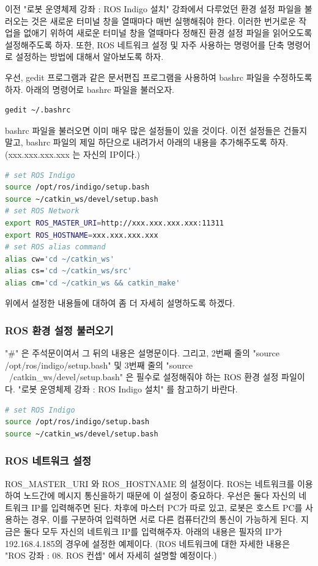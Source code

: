 이전 "로봇 운영체제 강좌 : ROS Indigo 설치" 강좌에서 다루었던 환경 설정 파일을 불러오는 것은 새로운 터미널 창을 열때마다 매번 실행해줘야 한다. 이러한 번거로운 작업을 없애기 위하여 새로운 터미널 창을 열때마다 정해진 환경 설정 파일을 읽어오도록 설정해주도록 하자. 또한, ROS 네트워크 설정 및 자주 사용하는 명령어를 단축 명령어로 설정하는 방법에 대해서 알아보도록 하자.

우선, gedit 프로그램과 같은 문서편집 프로그램을 사용하여 bashrc 파일을 수정하도록 하자. 아래의 명령어로 bashrc 파일을 불러오자.

\begin{lstlisting}[language=bash]
gedit ~/.bashrc
\end{lstlisting}

\noindent
bashrc 파일을 불러오면 이미 매우 많은 설정들이 있을 것이다. 이전 설정들은 건들지 말고, bashrc 파일의 제일 하단으로 내려가서 아래의 내용을 추가해주도록 하자. (xxx.xxx.xxx.xxx 는 자신의 IP이다.)

\begin{lstlisting}[language=bash]
# set ROS Indigo
source /opt/ros/indigo/setup.bash
source ~/catkin_ws/devel/setup.bash
# set ROS Network
export ROS_MASTER_URI=http://xxx.xxx.xxx.xxx:11311
export ROS_HOSTNAME=xxx.xxx.xxx.xxx
# set ROS alias command
alias cw='cd ~/catkin_ws'
alias cs='cd ~/catkin_ws/src'
alias cm='cd ~/catkin_ws && catkin_make'
\end{lstlisting}

위에서 설정한 내용들에 대하여 좀 더 자세히 설명하도록 하겠다.

\subsubsection{ROS 환경 설정 불러오기}
"\#" 은 주석문이여서 그 뒤의 내용은 설명문이다. 그리고,  2번째 줄의 "source /opt/ros/indigo/setup.bash" 및 3번째 줄의 "source ~/catkin\_ws/devel/setup.bash" 은 필수로 설정해줘야 하는 ROS 환경 설정 파일이다. "로봇 운영체제 강좌 : ROS Indigo 설치" 를 참고하기 바란다.

\begin{lstlisting}[language=bash]
# set ROS Indigo
source /opt/ros/indigo/setup.bash
source ~/catkin_ws/devel/setup.bash
\end{lstlisting}

\subsubsection{ROS 네트워크 설정}
ROS\_MASTER\_URI 와 ROS\_HOSTNAME 의 설정이다. ROS는 네트워크를 이용하여 노드간에 메시지 통신을하기 때문에 이 설정이 중요하다. 우선은 둘다 자신의 네트워크 IP를 입력해주면 된다. 차후에 마스터 PC가 따로 있고, 로봇은 호스트 PC를 사용하는 경우, 이를 구분하여 입력하면 서로 다른 컴퓨터간의 통신이 가능하게 된다. 지금은 둘다 모두 자신의 네트워크 IP를 입력해주자. 아래의 내용은 필자의 IP가 192.168.4.185의 경우에 설정한 예제이다. (ROS 네트워크에 대한 자세한 내용은 "ROS 강좌 : 08. ROS 컨셉" 에서 자세히 설명할 예정이다.)

